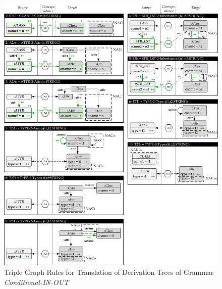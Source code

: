 \begin{example}
\begin{figure}[!tb]
\centering
\includegraphics[width=\textwidth]{img/software_trans/rules.pdf}
\caption{Triple Graph Rules for Translation of Derivation Trees of Grammar \textit{Conditional-IN-OUT}}
\label{fig:sec-compl-software-trans:rules}
\end{figure}


\end{example}

